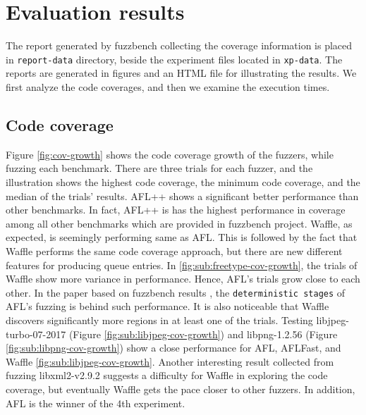 \section{Evaluation results}
\label{sec:ch4-report}

The report generated by fuzzbench collecting the coverage information is placed in \texttt{report-data} directory, beside the experiment files located in \texttt{xp-data}. The reports are generated in figures and an HTML file for illustrating the results. We first analyze the code coverages, and then we examine the execution times.

\subsection{Code coverage}

Figure \ref{fig:cov-growth} shows the code coverage growth of the fuzzers, while fuzzing each benchmark. There are three trials for each fuzzer, and the illustration shows the highest code coverage, the minimum code coverage, and the median of the trials' results. AFL++ shows a significant better performance than other benchmarks. In fact, AFL++ is has the highest performance in coverage among all other benchmarks which are provided in fuzzbench project. Waffle, as expected, is seemingly performing same as AFL. This is followed by the fact that Waffle performs the same code coverage approach, but there are new different features for producing queue entries. In \ref{fig:sub:freetype-cov-growth}, the trials of Waffle show more variance in performance. Hence, AFL's trials grow close to each other. In the paper based on fuzzbench results \cite{metzman2021fuzzbench}, the \texttt{deterministic stages} of AFL's fuzzing is behind such performance. It is also noticeable that Waffle discovers significantly more regions in at least one of the trials. Testing libjpeg-turbo-07-2017 (Figure \ref{fig:sub:libjpeg-cov-growth}) and libpng-1.2.56 (Figure \ref{fig:sub:libpng-cov-growth}) show a close performance for AFL, AFLFast, and Waffle \ref{fig:sub:libjpeg-cov-growth}. Another interesting result collected from fuzzing libxml2-v2.9.2 suggests a difficulty for Waffle in exploring the code coverage, but eventually Waffle gets the pace closer to other fuzzers. In addition, AFL is the winner of the 4th experiment.

